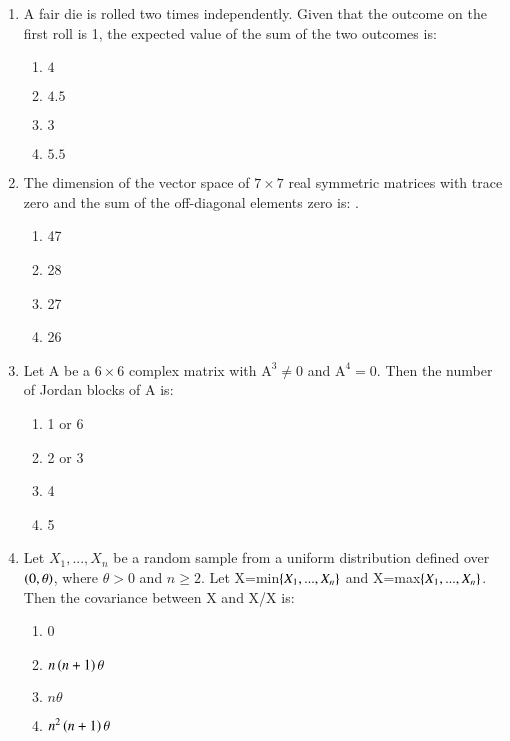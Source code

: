 \documentclass[journal]{IEEEtran}
\begin{document}
\begin{enumerate}


\item A fair die is rolled two times 
independently. Given that the outcome on the first roll is 1, the expected value of the sum of the two outcomes is:  

\begin{multicols}{4}
\begin{enumerate}
    \item $4$
    \item $4.5$
    \item $3$
    \item $5.5$
\end{enumerate}
\end{multicols}

\item The dimension of the vector space of $7\times7$
 real symmetric matrices with trace zero and the sum of the off-diagonal elements zero is:   .
\begin{multicols}{4}
\begin{enumerate}
    \item 47
    \item 28
    \item 27
    \item 26
\end{enumerate}
\end{multicols}

\item Let A be a $6\times6$
 complex matrix with $\text{A}^{3}\neq0$ and $\text{A}^{4}=0$. Then the number of Jordan blocks of A is:  

\begin{multicols}{4}
\begin{enumerate}
    \item 1 or 6
    \item 2 or 3
    \item 4
    \item 5
\end{enumerate}
\end{multicols}

\item Let $X_{1}, ..., X_{n}$ be a random sample from a uniform distribution defined over $\left(0,\theta\right)$, where $\theta>0$ and $n\geq2$. Let X=min$\left\{X_{1}, ..., X_{n}\right\}$ and X=max$\left\{X_{1}, ..., X_{n}\right\}$. Then the covariance between X and X/X is:
\begin{multicols}{4}
\begin{enumerate}
    \item 0
    \item $n\left(n+1\right)\theta$
    \item $n\theta$
    \item $n^2\left(n+1\right)\theta$
\end{enumerate}
\end{multicols}


\end{enumerate}
\end{document}
